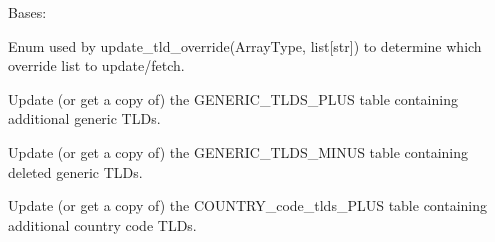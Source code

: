 \documentclass[letterpaper,10pt,english]{sphinxmanual}
\begin{document}
\begin{fulllineitems}
\begin{fulllineitems}
\label{\detokenize{apache_commons_validator_python.routines:apache_commons_validator_python.routines.domain_validator.DomainValidator.ArrayType}}
\pysigstartsignatures
{}
\pysigstopsignatures
\sphinxAtStartPar
Bases: 

\sphinxAtStartPar
Enum used by update\_tld\_override(ArrayType, list{[}str{]}) to determine which
override list to update/fetch.


\begin{fulllineitems}

\pysigstartsignatures
{}
\pysigstopsignatures
\sphinxAtStartPar
Update (or get a copy of) the GENERIC\_TLDS\_PLUS table containing additional generic TLDs.

\end{fulllineitems}



\begin{fulllineitems}

\pysigstartsignatures
{}
\pysigstopsignatures
\sphinxAtStartPar
Update (or get a copy of) the GENERIC\_TLDS\_MINUS table containing deleted generic TLDs.

\end{fulllineitems}



\begin{fulllineitems}

\pysigstartsignatures
{}
\pysigstopsignatures
\sphinxAtStartPar
Update (or get a copy of) the COUNTRY\_code\_tlds\_PLUS table containing additional country code TLDs.

\end{fulllineitems}




\end{fulllineitems}
\end{fulllineitems}
\end{document}
